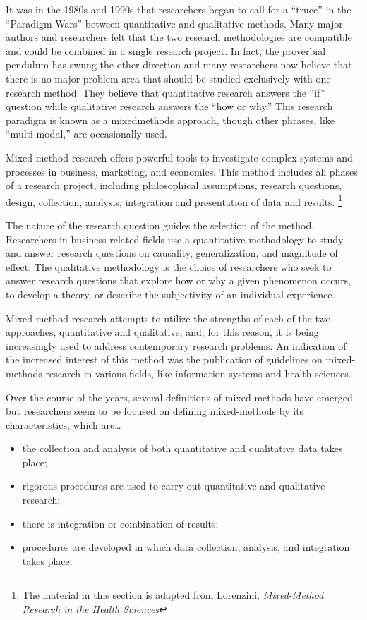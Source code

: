 It was in the 1980s and 1990s that researchers began to call for a ``truce'' in the ``Paradigm Wars'' between quantitative and qualitative methods. Many major authors and researchers felt that the two research methodologies are compatible and could be combined in a single research project. In fact, the proverbial pendulum has swung the other direction and many researchers now believe that there is no major problem area that should be studied exclusively with one research method. They believe that quantitative research answers the ``if'' question while qualitative research answers the ``how or why.'' This research paradigm is known as a \gls{mixedmethods} approach, though other phrases, like ``multi-modal,'' are occasionally used.

Mixed-method research offers powerful tools to investigate complex systems and processes in business, marketing, and economics. This method includes all phases of a research project, including philosophical assumptions, research questions, design, collection, analysis, integration and presentation of data and results. \footnote{The material in this section is adapted from Lorenzini, \textit{Mixed-Method Research in the Health Sciences}\cite{lorenzini2017mixed}}

The nature of the research question guides the selection of the method. Researchers in business-related fields use a quantitative methodology to study and answer research questions on causality, generalization, and magnitude of effect. The qualitative methodology is the choice of researchers who seek to answer research questions that explore how or why a given phenomenon occurs, to develop a theory, or describe the subjectivity of an individual experience.

Mixed-method research attempts to utilize the strengths of each of the two approaches, quantitative and qualitative, and, for this reason, it is being increasingly used to address contemporary research problems. An indication of the increased interest of this method was the publication of guidelines on mixed-methods research in various fields, like information systems\cite{venkatesh2013bridging} and health sciences\cite{creswell2004designing}.

Over the course of the years, several definitions of mixed methods have emerged but researchers seem to be focused on defining mixed-methods by its characteristics, which are\ldots

\begin{itemize}
	
	\item the collection and analysis of both quantitative and qualitative data takes place;

	\item rigorous procedures are used to carry out quantitative and qualitative research;

	\item there is integration or combination of results;

	\item procedures are developed in which data collection, analysis, and integration takes place.

\end{itemize}

